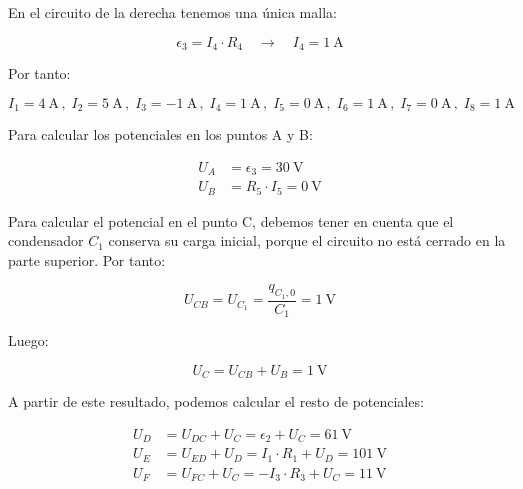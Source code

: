 \documentclass[10pt]{article}
\begin{document}
\vspace{2mm}
En el circuito de la derecha tenemos una única malla:

\begin{equation*}
  \epsilon_3 = I_4 \cdot R_4 \quad \rightarrow \quad I_4 = \qty{1}{\ampere}
\end{equation*}

\vspace{-2mm}
Por tanto:

\vspace{-3mm}
\begin{equation*}
  \boxed{I_1 = \qty{4}{\ampere}} \, , \; 
  \boxed{I_2 = \qty{5}{\ampere}} \, , \; 
  \boxed{I_3 = \qty{-1}{\ampere}} \, , \; 
  \boxed{I_4 = \qty{1}{\ampere}} \, , \; 
  \boxed{I_5 = \qty{0}{\ampere}} \, , \; 
  \boxed{I_6 = \qty{1}{\ampere}} \, , \; 
  \boxed{I_7 = \qty{0}{\ampere}} \, , \; 
  \boxed{I_8 = \qty{1}{\ampere}}
\end{equation*}

\vspace{4mm}
Para calcular los potenciales en los puntos A y B:

\vspace{-3mm}
\begin{align*}
  U_A &= \epsilon_3 = \boxed{\qty{30}{\volt}}\\
  U_B &= R_5 \cdot I_5 = \boxed{\qty{0}{\volt}}
\end{align*}

\vspace{3mm}
Para calcular el potencial en el punto C, debemos tener en cuenta que el condensador $C_1$ conserva su carga inicial, porque el circuito no está cerrado en la parte superior. Por tanto:

\begin{equation*}
  U_{CB} = U_{C_1} = \frac{q_{C_1,0}}{C_1} = \qty{1}{\volt}
\end{equation*}

Luego:

\vspace{-3mm}
\begin{equation*}
  U_C = U_{CB} + U_B = \boxed{\qty{1}{\volt}}
\end{equation*}

\vspace{3mm}
A partir de este resultado, podemos calcular el resto de potenciales:

\vspace{-3mm}
\begin{align*}
  U_D &= U_{DC} + U_C = \epsilon_2 + U_C = \boxed{\qty{61}{\volt}}\\
  U_E &= U_{ED} + U_D = I_1 \cdot R_1 + U_D = \boxed{\qty{101}{\volt}}\\
  U_F &= U_{FC} + U_C = -I_3 \cdot R_3 + U_C = \boxed{\qty{11}{\volt}}
\end{align*}
\end{document}
